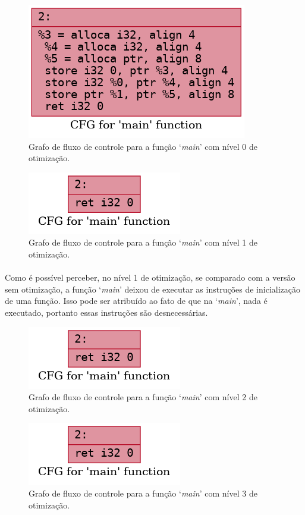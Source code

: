 \documentclass[12pt]{article}
\begin{document}
\begin{figure}
    \centering
    \includegraphics[width=0.5\linewidth]{private_.main_O0.png}
    \caption{Grafo de fluxo de controle para a função ‘\textit{main}’ com nível 0 de otimização.}
\end{figure}

\begin{figure}
    \centering
    \includegraphics[width=0.5\linewidth]{private_.main_O1.png}
    \caption{Grafo de fluxo de controle para a função ‘\textit{main}’ com nível 1 de otimização.}
\end{figure}

\paragraph{}Como é possível perceber, no nível 1 de otimização, se comparado com a versão sem otimização, a função ‘\textit{main}’ deixou de executar as instruções de inicialização de uma função. Isso pode ser atribuído ao fato de que na ‘\textit{main}’, nada é executado, portanto essas instruções são desnecessárias.

\begin{figure}
    \centering
    \includegraphics[width=0.5\linewidth]{private_.main_O2.png}
    \caption{Grafo de fluxo de controle para a função ‘\textit{main}’ com nível 2 de otimização.}
\end{figure}

\begin{figure}
    \centering
    \includegraphics[width=0.5\linewidth]{private_.main_O3.png}
    \caption{Grafo de fluxo de controle para a função ‘\textit{main}’ com nível 3 de otimização.}
\end{figure}
\end{document}
